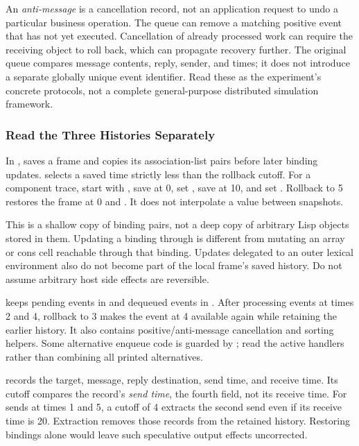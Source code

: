 An \emph{anti-message} is a cancellation record, not an application
request to undo a particular business operation. The queue can remove
a matching positive event that has not yet executed. Cancellation of
already processed work can require the receiving object to roll back,
which can propagate recovery further.
The original queue compares message contents, reply, sender, and times;
it does not introduce a separate globally unique event identifier.
Read these as the experiment's concrete protocols, not a complete
general-purpose distributed simulation framework.

\subsubsection{Read the Three Histories Separately}
\label{sec:tw-histories}

In ,  saves a frame and
copies its association-list pairs before later binding updates.
 selects a saved time strictly less than the rollback
cutoff. For a component trace, start with , save at 0,
set , save at 10, and set .
Rollback to 5 restores the frame at 0 and .
It does not interpolate a value between snapshots.

This is a shallow copy of binding pairs, not a deep copy of arbitrary
Lisp objects stored in them. Updating a binding through 
is different from mutating an array or cons cell reachable through
that binding. Updates delegated to an outer lexical environment also
do not become part of the local frame's saved history.
Do not assume arbitrary host side effects are reversible.

 keeps pending events in
 and dequeued events in . After processing
events at times 2 and 4, rollback to 3 makes the event at 4 available
again while retaining the earlier history. It also contains
positive/anti-message cancellation and sorting helpers.
Some alternative enqueue code is guarded by ;
read the active handlers rather than combining all printed alternatives.

 records the target, message,
reply destination, send time, and receive time. Its cutoff compares the
record's \emph{send time}, the fourth field, not its receive time.
For sends at times 1 and 5, a cutoff of 4 extracts the second send
even if its receive time is 20. Extraction removes those records
from the retained history. Restoring bindings alone would leave
such speculative output effects uncorrected.

